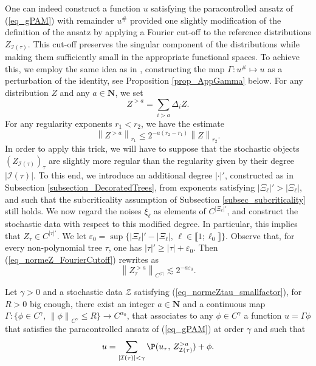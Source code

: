 \documentclass[11pt]{preprint}
\newcommand{\mcI}{\mathcal{I}}
\newcommand{\mcZ}{\mathcal{Z}}
\def\eps{\varepsilon}
\let\eps\varepsilon
\def\eqref#1{(\ref{#1})}
\newcommand{\bfN}{\mathbf{N}}
\newcommand{\norme}[1]{\left\lVert #1 \right\lVert}
\newcommand{\bbrack}[1]{ \llbracket #1 \rrbracket }
\begin{document}
	One can indeed construct a function $u$ satisfying the paracontrolled ansatz of \eqref{eq_gPAM} with remainder $u^\#$ provided one slightly modification of the definition of the ansatz by applying a Fourier cut-off to the reference distributions $Z_{\mcI(\tau)}$. This cut-off preserves the singular component of the distributions while making them sufficiently small in the appropriate functional spaces. To achieve this, we employ the same idea as in  \cite[Lemma 4.12]{AllezChouk}, constructing the map $\Gamma : u^\# \mapsto u$ as a perturbation of the identity, see Proposition \ref{prop_AppGamma} below.
	For any distribution $Z$ and any $a\in\bfN$, we set 
	\begin{equation}\label{eq_defZ_FourierCutoff}
		Z^{>a} = \sum_{i>a} \Delta_i Z.
	\end{equation}
	For any regularity exponents $r_1<r_2$, we have the estimate 
	\begin{equation}\label{eq_normeZ_FourierCutoff}
		\norme{Z^{>a}}_{r_1} \leq 2^{-a(r_2-r_1)}\norme{Z}_{r_2}.
	\end{equation}
	In order to apply this trick, we will have to suppose that the stochastic objects $(Z_{\mcI(\tau)})_\tau$ are slightly more regular than the regularity given by their degree $|\mcI(\tau)|$. To this end, we introduce an additional degree $|\cdot|'$, constructed as in Subsection \ref{subsection_DecoratedTrees}, from exponents satisfying $|\Xi_\ell|' > |\Xi_\ell|$, and such that the subcriticality assumption of Subsection \ref{subsec_subcriticality} still holds. We now regard the noises $\xi_\ell$ as elements of $C^{|\Xi_\ell|'}$, and construct the stochastic data with respect to this modified degree. In particular, this implies that $Z_\tau \in C^{|\tau|'}$. We let $\eps_0 = \sup\{ |\Xi_\ell|'-|\Xi_\ell|, \, \ell\in\bbrack{1;\ell_0}  \}$. Observe that, for every non-polynomial tree $\tau$, one has $|\tau|'\geq|\tau|+\eps_0$. Then \eqref{eq_normeZ_FourierCutoff} rewrites as 
	\begin{equation}\label{eq_normeZtau_smallfactor}
	\norme{Z_\tau^{>a}}_{C^{|\tau|}} \lesssim 2^{-a\eps_0}.
\end{equation}
	
	
	\begin{proposition}\label{prop_AppGamma}
		Let $\gamma >0 $ and a stochastic data $\mcZ$ satisfying \eqref{eq_normeZtau_smallfactor}, for $R>0$ big enough, there exist an integer $a\in\bfN$ and a continuous map $\Gamma : \{ \phi \in C^\gamma, \, \norme{\phi}_{C^\gamma}\leq R \} \to C^{\alpha_0}$, that associates to any $\phi\in C^\gamma$ a function $u=\Gamma \phi$ that satisfies the paracontrolled ansatz of \eqref{eq_gPAM} at order $\gamma$ and such that  
		\begin{equation}
			u=\sum_{|\mcI(\tau)|<\gamma}\P(  u_\tau   , \, Z_{\mcI(\tau)}^{>a})+\phi.
		\end{equation}
	\end{proposition}
	
\end{document}
